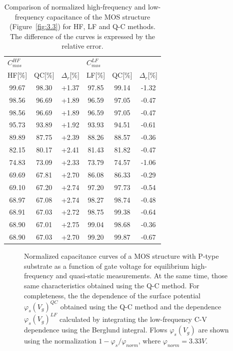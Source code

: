 \begin{table}[h!]\centering
  \begin{tabular}{c c c c c c}
    \multicolumn{3}{l}{$C^{HF}_{mos}$} & \multicolumn{3}{l}{$C^{LF}_{mos}$} \\
    HF[\%] & QC[\%] & $\Delta_r$[\%] & LF[\%] & QC[\%] & $\Delta_r$[\%] \\
    \hline%
    99.67 & 98.30 & +1.37 & 97.85 & 99.14 & -1.32 \\
    98.56 & 96.69 & +1.89 & 96.59 & 97.05 & -0.47 \\
    98.56 & 96.69 & +1.89 & 96.59 & 97.05 & -0.47 \\
    95.73 & 93.89 & +1.92 & 93.93 & 94.51 & -0.61 \\
    89.89 & 87.75 & +2.39 & 88.26 & 88.57 & -0.36 \\
    82.15 & 80.17 & +2.41 & 81.43 & 81.82 & -0.47 \\
    74.83 & 73.09 & +2.33 & 73.79 & 74.57 & -1.06 \\
    69.69 & 67.81 & +2.70 & 86.08 & 86.33 & -0.29 \\
    69.10 & 67.20 & +2.74 & 97.20 & 97.73 & -0.54 \\
    68.97 & 67.08 & +2.74 & 98.27 & 98.74 & -0.48 \\
    68.91 & 67.03 & +2.72 & 98.75 & 99.38 & -0.64 \\
    68.90 & 67.01 & +2.75 & 99.04 & 98.68 & -0.36 \\
    68.90 & 67.03 & +2.70 & 99.20 & 99.87 & -0.67 \\
  \end{tabular}
  \caption[Comparison of normalized frequency and low-frequency
    capacitance of the MOS structure (Figure~\ref{fig:3.3}) for HF, LF
    and Q-C methods]{Comparison of normalized high-frequency and
    low-frequency capacitance of the MOS structure
    (Figure~\ref{fig:3.3}) for HF, LF and Q-C methods. The difference
    of the curves is expressed by the relative error.}\label{tab:3.1}
\end{table}

\newpage
\begin{figure}[h!]\centering
  
  \captionsetup{justification=raggedright, singlelinecheck=false}
  \caption[Normalized capacitance curves of MOS structure with
    substrate type P as a function of gate voltage for equilibrium
    high-frequency and quasi-static measurements]{Normalized
    capacitance curves of a MOS structure with P-type substrate as a
    function of gate voltage for equilibrium high-frequency and
    quasi-static measurements.  At the same time, those same
    characteristics obtained using the Q-C method. For completeness,
    the the dependence of the surface potential
    ${\varphi_s(V_g)}^{QC}$ obtained using the Q-C method and the
    dependence ${\varphi_s(V_g)}^{LF}$ calculated by integrating the
    low-frequency C-V dependence using the Berglund integral. Flows
    $\varphi_s(V_g)$ are shown using the normalization $1 -
    {\varphi_s}/{\varphi_{norm}}$, where
    $\varphi_{norm}=3.33V$.}\label{fig:3.4}
\end{figure}

